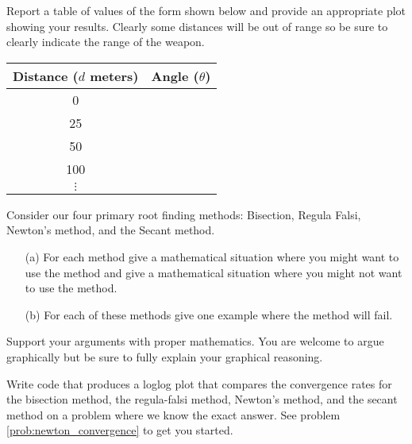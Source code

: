 \begin{problem}
\begin{enumerate}
            Report a table of values of the form shown below and provide an appropriate
            plot showing your results.  Clearly some distances will be out of range so be
            sure to clearly indicate the range of the weapon.
            \begin{center}
                \begin{tabular}{|c|c|}
                    \hline
                    Distance ($d$ meters) & Angle ($\theta$) \\ \hline \hline
                    0 & \\
                    25 & \\
                    50 & \\
                    100 & \\
                    $\vdots$ & \\ \hline
                \end{tabular}
            \end{center}
    \end{enumerate}
\end{problem}


\begin{problem}
    Consider our four primary root finding methods: Bisection, Regula Falsi, Newton's method, and the
    Secant method.  
    \begin{enumerate}
        \item[(a)] For each method give a mathematical situation where you might want to
            use the method and give a mathematical situation where you might not want to
            use the method.  
        \item[(b)] For each of these methods give one example where the method will fail.  
        \end{enumerate}
        Support your arguments with proper mathematics.  You are welcome to argue
        graphically but be sure to fully explain your graphical reasoning.
\end{problem}


\begin{problem}
    Write \ProgLang code that produces a loglog plot that compares the convergence rates for
    the bisection method, the regula-falsi method, Newton's method, and the secant method
    on a problem where we know the exact answer. See problem \ref{prob:newton_convergence}
    to get you started.
\end{problem}



